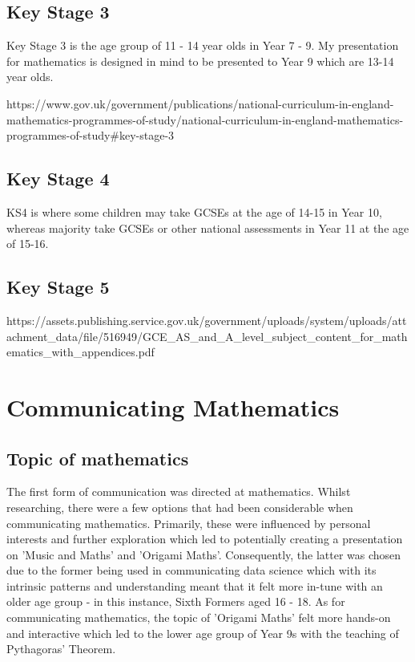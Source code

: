 \documentclass[12pt, a4paper,oneside]{book}
\numberwithin{equation}{section}
\begin{document}
\section{Key Stage 3}
Key Stage 3 is the age group of 11 - 14 year olds in Year 7 - 9. My presentation for mathematics is designed in mind to be presented to Year 9 which are 13-14 year olds.

https://www.gov.uk/government/publications/national-curriculum-in-england-mathematics-programmes-of-study/national-curriculum-in-england-mathematics-programmes-of-study#key-stage-3

\section{Key Stage 4}
KS4 is where some children may take GCSEs at the age of 14-15 in Year 10, whereas majority take GCSEs or other national assessments in Year 11 at the age of 15-16.

\section{Key Stage 5}
https://assets.publishing.service.gov.uk/government/uploads/system/uploads/attachment_data/file/516949/GCE_AS_and_A_level_subject_content_for_mathematics_with_appendices.pdf

\chapter{Communicating Mathematics}\label{ch:x.x}

\section{Topic of mathematics}\label{sec:x.x}
The first form of communication was directed at mathematics. Whilst researching, there were a few options that had been considerable when communicating mathematics. Primarily, these were influenced by personal interests and further exploration which led to potentially creating a presentation on 'Music and Maths' and 'Origami Maths'. Consequently, the latter was chosen due to the former being used in communicating data science which with its intrinsic patterns and understanding meant that it felt more in-tune with an older age group - in this instance, Sixth Formers aged 16 - 18. As for communicating mathematics, the topic of 'Origami Maths' felt more hands-on and interactive which led to the lower age group of Year 9s with the teaching of Pythagoras' Theorem.
\end{document}
